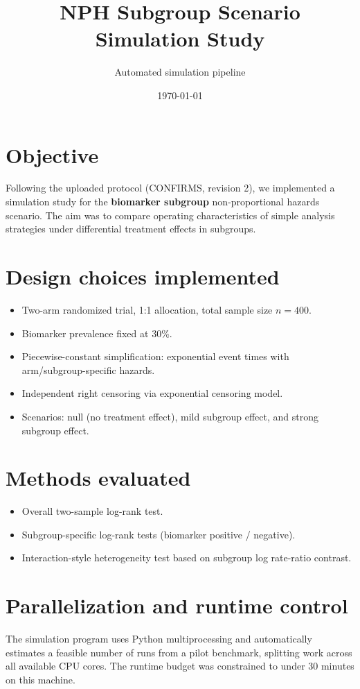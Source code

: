 \documentclass[11pt]{article}
\title{NPH Subgroup Scenario Simulation Study}
\author{Automated simulation pipeline}
\date{\today}
\begin{document}
\maketitle

\section*{Objective}
Following the uploaded protocol (CONFIRMS, revision 2), we implemented a simulation study for the \textbf{biomarker subgroup} non-proportional hazards scenario. The aim was to compare operating characteristics of simple analysis strategies under differential treatment effects in subgroups.

\section*{Design choices implemented}
\begin{itemize}
  \item Two-arm randomized trial, 1:1 allocation, total sample size $n=400$.
  \item Biomarker prevalence fixed at 30\%.
  \item Piecewise-constant simplification: exponential event times with arm/subgroup-specific hazards.
  \item Independent right censoring via exponential censoring model.
  \item Scenarios: null (no treatment effect), mild subgroup effect, and strong subgroup effect.
\end{itemize}

\section*{Methods evaluated}
\begin{itemize}
  \item Overall two-sample log-rank test.
  \item Subgroup-specific log-rank tests (biomarker positive / negative).
  \item Interaction-style heterogeneity test based on subgroup log rate-ratio contrast.
\end{itemize}

\section*{Parallelization and runtime control}
The simulation program uses Python multiprocessing and automatically estimates a feasible number of runs from a pilot benchmark, splitting work across all available CPU cores. The runtime budget was constrained to under 30 minutes on this machine.
\end{document}
